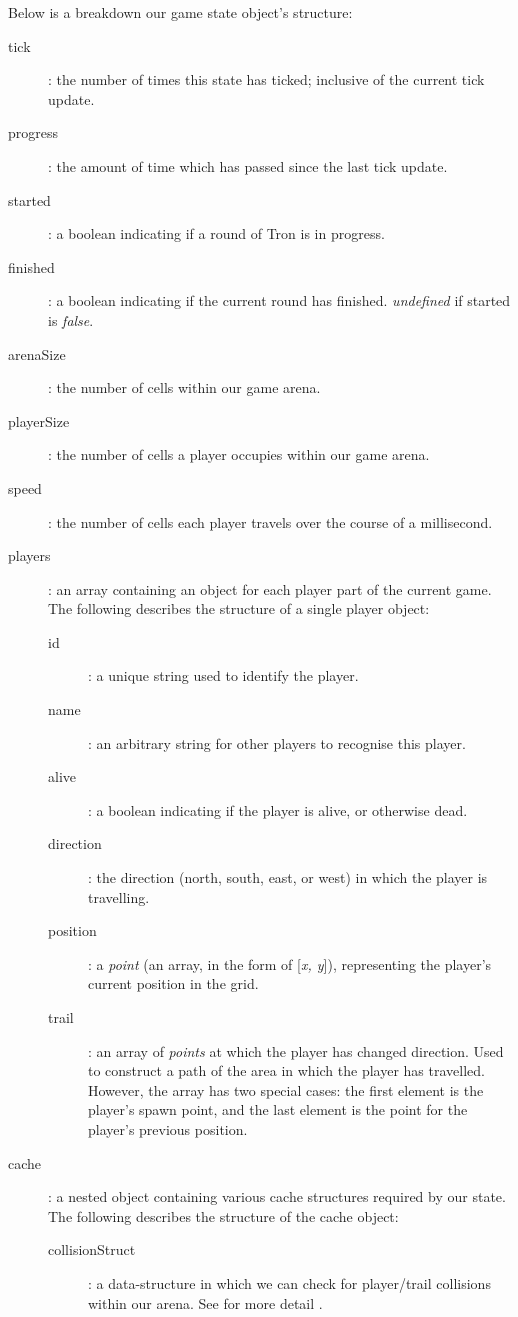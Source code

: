 \documentclass{standalone}
\begin{document}
		Below is a breakdown our game state object's structure:
		\begin{formal}
			\begin{description}
	        \item[tick]: the number of times this state has ticked; inclusive of the current tick update.
	        \item[progress]: the amount of time which has passed since the last tick update.
	        \item[started]: a boolean indicating if a round of Tron is in progress.
	        \item[finished]: a boolean indicating if the current round has finished. \emph{undefined} if started is \emph{false}.
	        \item[arenaSize]: the number of cells within our game arena.
	        \item[playerSize]: the number of cells a player occupies within our game arena.
	        \item[speed]: the number of cells each player travels over the course of a millisecond.
	        \item[players]: an array containing an object for each player part of the current game. The following describes the structure of a single player object:
	        \begin{description}
	        	\item[id]: a unique string used to identify the player.
	        	\item[name]: an arbitrary string for other players to recognise this player.
	        	\item[alive]: a boolean indicating if the player is alive, or otherwise dead.
	        	\item[direction]: the direction (north, south, east, or west) in which the player is travelling.
	        	\item[position]: a \emph{point} (an array, in the form of [\emph{x, y}]), representing the player's current position in the grid.
	        	\item[trail]: an array of \emph{points} at which the player has changed direction. Used to construct a path of the area in which the player has travelled. However, the array has two special cases: the first element is the player's spawn point, and the last element is the point for the player's previous position.
	      	\end{description}
	        \item[cache]: a nested object containing various cache structures required by our state. The following describes the structure of the cache object:
	        \begin{description}
	        	\item[collisionStruct]: a data-structure in which we can check for player/trail collisions within our arena. See for more detail .
	      	\end{description}
	    \end{description}
    \end{formal}
\end{document}
